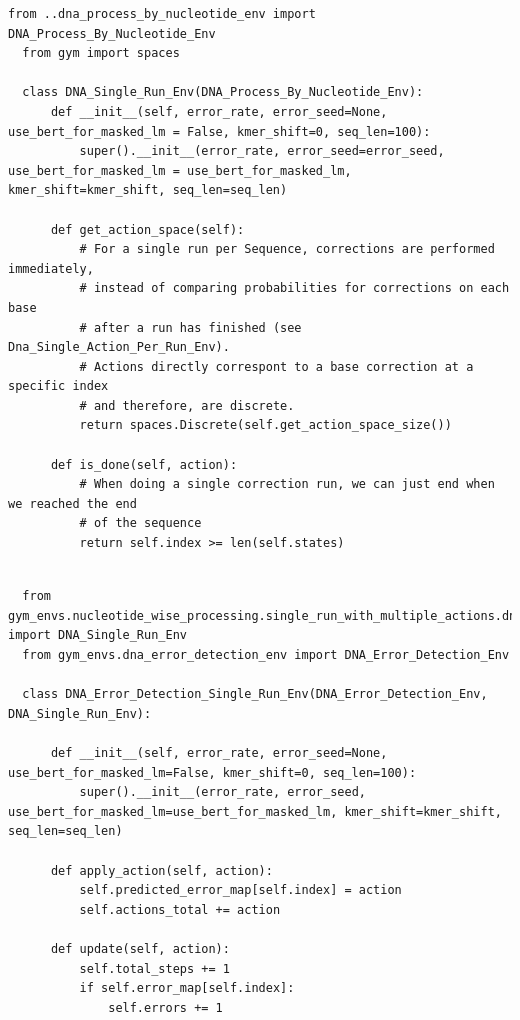 \documentclass[oneside,bibliography=totocnumbered,BCOR=5mm]{scrbook}%
\theoremstyle{definition}
\theoremstyle{definition}
\theoremstyle{definition}
\theoremstyle{definition}
\theoremstyle{definition}
\theoremstyle{definition}
\begin{document}
\begin{appendix}
\begin{lstlisting}[caption={DNA-Environment für Fehlererkennung}]
\end{lstlisting}

\begin{lstlisting}[caption={DNA-Environment für Verarbeitung der DNA-Sequenz in einem einzigen Durchlauf}]
  from ..dna_process_by_nucleotide_env import DNA_Process_By_Nucleotide_Env
  from gym import spaces
  
  class DNA_Single_Run_Env(DNA_Process_By_Nucleotide_Env):
      def __init__(self, error_rate, error_seed=None, use_bert_for_masked_lm = False, kmer_shift=0, seq_len=100):
          super().__init__(error_rate, error_seed=error_seed, use_bert_for_masked_lm = use_bert_for_masked_lm, kmer_shift=kmer_shift, seq_len=seq_len)
  
      def get_action_space(self):
          # For a single run per Sequence, corrections are performed immediately,
          # instead of comparing probabilities for corrections on each base 
          # after a run has finished (see Dna_Single_Action_Per_Run_Env).
          # Actions directly correspont to a base correction at a specific index 
          # and therefore, are discrete.
          return spaces.Discrete(self.get_action_space_size()) 
  
      def is_done(self, action):
          # When doing a single correction run, we can just end when we reached the end 
          # of the sequence
          return self.index >= len(self.states)
\end{lstlisting}

\begin{lstlisting}[caption={DNA-Environment für Fehlererkennung in einem einzigen Durchlauf}]

  from gym_envs.nucleotide_wise_processing.single_run_with_multiple_actions.dna_single_run_env import DNA_Single_Run_Env
  from gym_envs.dna_error_detection_env import DNA_Error_Detection_Env
  
  class DNA_Error_Detection_Single_Run_Env(DNA_Error_Detection_Env, DNA_Single_Run_Env):
  
      def __init__(self, error_rate, error_seed=None, use_bert_for_masked_lm=False, kmer_shift=0, seq_len=100):
          super().__init__(error_rate, error_seed, use_bert_for_masked_lm=use_bert_for_masked_lm, kmer_shift=kmer_shift, seq_len=seq_len)
      
      def apply_action(self, action):
          self.predicted_error_map[self.index] = action
          self.actions_total += action 
  
      def update(self, action):
          self.total_steps += 1
          if self.error_map[self.index]:
              self.errors += 1
  

\end{lstlisting}
\end{appendix}
\end{document}

